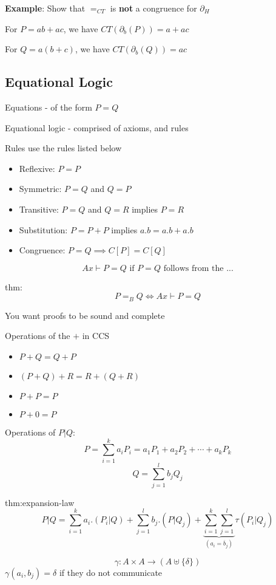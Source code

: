 \documentclass{article}
\begin{document}
\textbf{Example}: Show that $=_{CT}$ is \textbf{not} a congruence for $\partial_{H}$

For $P = ab + ac$, we have $CT(\partial_{b}(P)) = a + ac$

For $Q = a(b + c)$, we have $CT(\partial_{b}(Q)) = ac$

\subsection{Equational Logic}

Equations - of the form $P = Q$

Equational logic - comprised of axioms, and rules

Rules use the rules listed below
\begin{itemize}
    \item Reflexive: $P = P$
    \item Symmetric: $P = Q$ and $Q = P$
    \item Transitive: $P = Q$ and $Q = R$ implies $P = R$
    \item Substitution: $P = P + P$ implies $a.b = a.b + a.b$
    \item Congruence: $P = Q \implies C[P] = C[Q]$
\end{itemize}

\[Ax \vdash P = Q \text{ if $P = Q$ follows from the ...} \]

\begin{thm}[]{thm:}{}
    \[P =_{B} Q \iff Ax \vdash P = Q\]
\end{thm}

You want proofs to be sound and complete

Operations of the $+$ in CCS
\begin{itemize}
    \item $P + Q = Q + P$
    \item $(P + Q) + R = R + (Q + R)$
    \item $P + P = P$
    \item $P + 0 = P$
\end{itemize}

Operations of $P | Q$:
\[P = \sum_{i = 1}^{k} a_{i} P_{i} = a_{1}P_{1} + a_{2}P_{2}+\cdots+a_{k}P_{k}\]
\[Q = \sum_{j = 1}^{l} b_{j} Q_{j}\]

\begin{thm}{thm:expansion-law}{}
    \[
        P | Q = \sum_{i = 1}^{k} a_{i} . (P_{i} | Q) + \sum_{j = 1}^{l} b_{j} . (P | Q_{j}) + \underbrace{\sum_{i = 1}^{k}\sum_{j = 1}^{l}}_{(a_{i} = \overline{b}_{j})} \tau (P_{i} | Q_{j})
    \]

        \[\gamma : A \times A \to (A \uplus \{\delta\})\]
        $\gamma(a_{i},b_{j}) = \delta$ if they do not communicate
\end{thm}
\end{document}

